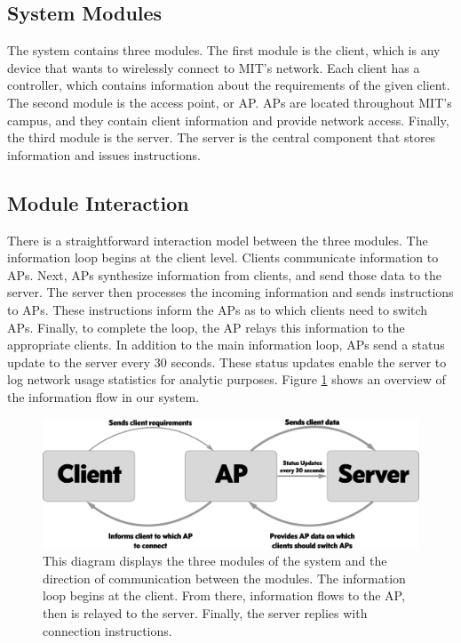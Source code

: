 \documentclass[10pt,journal,compsoc]{IEEEtran}
\begin{document}
		\subsection{System Modules}
		The system contains three modules. The first module is the client, which is any device that wants to wirelessly connect to MIT's network. Each client has a controller, which contains information about the requirements of the given client. The second module is the access point, or AP. APs are located throughout MIT's campus, and they contain client information and provide network access. Finally, the third module is the server. The server is the central component that stores information and issues instructions.
		
		\subsection{Module Interaction}
		There is a straightforward interaction model between the three modules. The information loop begins at the client level. Clients communicate information to APs. Next, APs synthesize information from clients, and send those data to the server. The server then processes the incoming information and sends instructions to APs. These instructions inform the APs as to which clients need to switch APs. Finally, to complete the loop, the AP relays this information to the appropriate clients. In addition to the main information loop, APs send a status update to the server every 30 seconds. These status updates enable the server to log network usage statistics for analytic purposes. Figure \ref{fig:overview} shows an overview of the information flow in our system. 
		
        \begin{figure}
            \includegraphics[width=\linewidth]{overviewDiagram.png}
            \caption{This diagram displays the three modules of the system and the direction of communication between the modules. The information loop begins at the client. From there, information flows to the AP, then is relayed to the server. Finally, the server replies with connection instructions.}
            \label{fig:overview}
        \end{figure}
		
\end{document}
